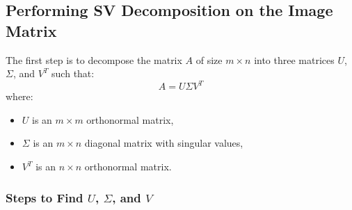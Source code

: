 \documentclass[12pt]{article}
\begin{document}
\subsection{Performing SV Decomposition on the Image Matrix}
The first step is to decompose the matrix \(A\) of size \(m \times n\) into three matrices \(U\), \(\Sigma\), and \(V^T\) such that:
\[
A = U \Sigma V^T
\]
where:
\begin{itemize}
    \item \(U\) is an \(m \times m\) orthonormal matrix,
    \item \(\Sigma\) is an \(m \times n\) diagonal matrix with singular values,
    \item \(V^T\) is an \(n \times n\) orthonormal matrix.
\end{itemize}

\subsubsection{Steps to Find \(U\), \(\Sigma\), and \(V\)}
\end{document}
